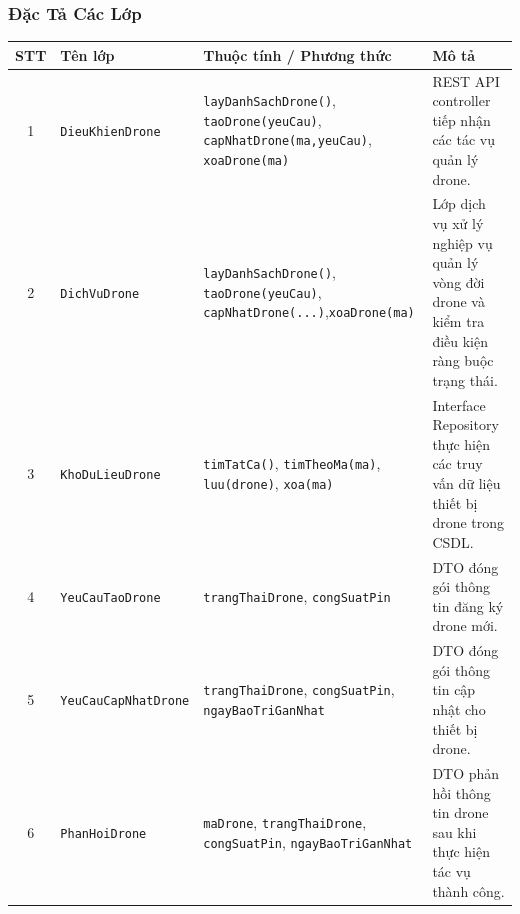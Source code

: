 \subsubsection{Đặc Tả Các Lớp}
\begin{table}[H]
  \centering
  \small
  \begin{tabularx}{\textwidth}{|c|>{\raggedright\arraybackslash}p{3.5cm}|>{\raggedright\arraybackslash}p{4.5cm}|>{\raggedright\arraybackslash}X|}
    \hline
    \textbf{STT} & \textbf{Tên lớp} & \textbf{Thuộc tính / Phương thức} & \textbf{Mô tả} \\
    \hline
    1 & \texttt{Dieu\allowbreak Khien\allowbreak Drone} & \texttt{lay\allowbreak Danh\allowbreak Sach\allowbreak Drone\allowbreak ()}, \texttt{tao\allowbreak Drone\allowbreak (yeu\allowbreak Cau)}, \texttt{cap\allowbreak Nhat\allowbreak Drone\allowbreak (ma,\allowbreak yeu\allowbreak Cau)}, \texttt{xoa\allowbreak Drone\allowbreak (ma)} & REST API controller tiếp nhận các tác vụ quản lý drone. \\ \hline
    2 & \texttt{Dich\allowbreak Vu\allowbreak Drone} & \texttt{lay\allowbreak Danh\allowbreak Sach\allowbreak Drone\allowbreak ()}, \texttt{tao\allowbreak Drone\allowbreak (yeu\allowbreak Cau)}, \texttt{cap\allowbreak Nhat\allowbreak Drone\allowbreak (...)},\newline \texttt{xoa\allowbreak Drone\allowbreak (ma)} & Lớp dịch vụ xử lý nghiệp vụ quản lý vòng đời drone và kiểm tra điều kiện ràng buộc trạng thái. \\ \hline
    3 & \texttt{Kho\allowbreak Du\allowbreak Lieu\allowbreak Drone} & \texttt{tim\allowbreak Tat\allowbreak Ca\allowbreak ()}, \texttt{tim\allowbreak Theo\allowbreak Ma\allowbreak (ma)}, \texttt{luu\allowbreak (drone)}, \texttt{xoa\allowbreak (ma)} & Interface Repository thực hiện các truy vấn dữ liệu thiết bị drone trong CSDL. \\ \hline
    4 & \texttt{Yeu\allowbreak Cau\allowbreak Tao\allowbreak Drone} & \texttt{trang\allowbreak Thai\allowbreak Drone}, \texttt{cong\allowbreak Suat\allowbreak Pin} & DTO đóng gói thông tin đăng ký drone mới. \\ \hline
    5 & \texttt{Yeu\allowbreak Cau\allowbreak Cap\allowbreak Nhat\allowbreak Drone} & \texttt{trang\allowbreak Thai\allowbreak Drone}, \texttt{cong\allowbreak Suat\allowbreak Pin}, \texttt{ngay\allowbreak Bao\allowbreak Tri\allowbreak Gan\allowbreak Nhat} & DTO đóng gói thông tin cập nhật cho thiết bị drone. \\ \hline
    6 & \texttt{Phan\allowbreak Hoi\allowbreak Drone} & \texttt{ma\allowbreak Drone}, \texttt{trang\allowbreak Thai\allowbreak Drone}, \texttt{cong\allowbreak Suat\allowbreak Pin}, \texttt{ngay\allowbreak Bao\allowbreak Tri\allowbreak Gan\allowbreak Nhat} & DTO phản hồi thông tin drone sau khi thực hiện tác vụ thành công. \\ \hline

\end{tabularx}
\end{table}
